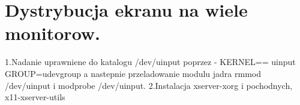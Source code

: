 \section{Dystrybucja ekranu na wiele monitorow.}
1.Nadanie uprawniene do katalogu /dev/uinput poprzez - KERNEL== uinput GROUP=udevgroup a nastepnie przeladowanie modulu jadra rmmod /dev/uinput i modprobe /dev/uinput.
2.Instalacja xserver-xorg i pochodnych, x11-xserver-utils
